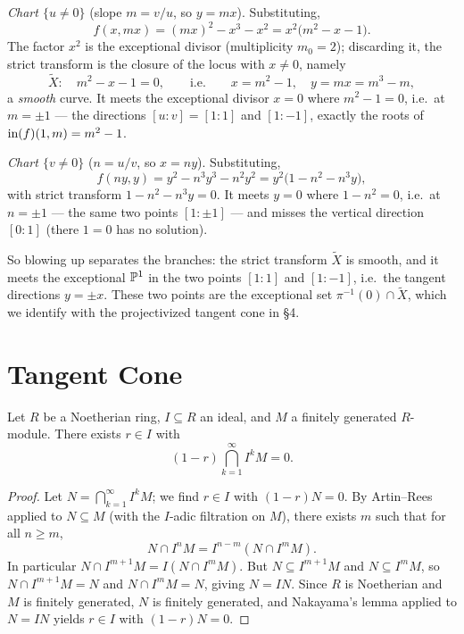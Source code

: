 \documentclass[11pt]{article}
\begin{document}
\medskip
\noindent\textit{Chart $\{u \neq 0\}$} (slope $m = v/u$, so $y = mx$). Substituting,
\[f(x, mx) = (mx)^2 - x^3 - x^2 = x^2\big(m^2 - x - 1\big).\]
The factor $x^2$ is the exceptional divisor (multiplicity $m_0 = 2$); discarding it, the strict transform is the closure of the locus with $x \neq 0$, namely
\[\widetilde X : \quad m^2 - x - 1 = 0, \qquad\text{i.e.}\qquad x = m^2 - 1, \quad y = mx = m^3 - m,\]
a \emph{smooth} curve. It meets the exceptional divisor $x = 0$ where $m^2 - 1 = 0$, i.e.\ at $m = \pm 1$ --- the directions $[u:v] = [1:1]$ and $[1:-1]$, exactly the roots of $\init(f)(1,m) = m^2 - 1$.
 
\medskip
\noindent\textit{Chart $\{v \neq 0\}$} ($n = u/v$, so $x = ny$). Substituting,
\[f(ny, y) = y^2 - n^3 y^3 - n^2 y^2 = y^2\big(1 - n^2 - n^3 y\big),\]
with strict transform $1 - n^2 - n^3 y = 0$. It meets $y = 0$ where $1 - n^2 = 0$, i.e.\ at $n = \pm 1$ --- the same two points $[1 : \pm 1]$ --- and misses the vertical direction $[0:1]$ (there $1 = 0$ has no solution).
 
\medskip
So blowing up separates the branches: the strict transform $\widetilde X$ is smooth, and it meets the exceptional $\P^1$ in the two points $[1:1]$ and $[1:-1]$, i.e.\ the tangent directions $y = \pm x$. These two points are the exceptional set $\pi^{-1}(0) \cap \widetilde X$, which we identify with the projectivized tangent cone in \S4.

\section{Tangent Cone}

\begin{theorem}
    Let $R$ be a Noetherian ring, $I \subseteq R$ an ideal, and $M$ a finitely generated $R$-module. There exists $r \in I$ with
    \[(1-r) \bigcap_{k=1}^\infty I^kM = 0.\]
\end{theorem}

\begin{proof}
    Let $N = \bigcap_{k=1}^\infty I^k M$; we find $r \in I$ with $(1-r)N = 0$. By Artin--Rees applied to $N \subseteq M$ (with the $I$-adic filtration on $M$), there exists $m$ such that for all $n \geq m$,
    \[N \cap I^n M = I^{n-m}(N \cap I^m M).\]
    In particular $N \cap I^{m+1}M = I(N \cap I^m M)$. But $N \subseteq I^{m+1}M$ and $N \subseteq I^m M$, so $N \cap I^{m+1}M = N$ and $N \cap I^m M = N$, giving $N = IN$. Since $R$ is Noetherian and $M$ is finitely generated, $N$ is finitely generated, and Nakayama's lemma applied to $N = IN$ yields $r \in I$ with $(1-r)N = 0$.
\end{proof}
\end{document}
